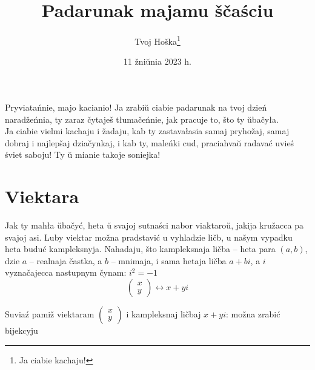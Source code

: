 \documentclass{article}
\title{Padarunak majamu ščaściu}
\author{Tvoj Hoška\thanks{Ja ciabie kachaju!}}
\date{11 žniŭnia 2023 h.}
\newcommand{\rl}{\hspace*{5mm}}
\begin{document}
\maketitle
\begin{center}
    Pryviatańnie, majo kacianio! Ja zrabiŭ ciabie padarunak na tvoj dzień naradžeńnia, ty zaraz čytaješ tłumačeńnie, jak pracuje to, što ty ŭbačyła. \\
    \vspace{3mm}
    Ja ciabie vielmi kachaju i žadaju, kab ty zastavałasia samaj pryhožaj, samaj dobraj i najlepšaj dziačynkaj, i kab ty, maleńki cud, praciahvaŭ radavać uvieś śviet saboju! Ty ŭ mianie takoje soniejka!
\end{center}
\newpage
\section{Viektara}
\rl Jak ty mahła ŭbačyć, heta ŭ svajoj sutnaści nabor viaktaroŭ, jakija kružacca pa svajoj asi.
Luby viektar možna pradstavić u vyhladzie ličb, u našym vypadku heta buduć kampleksnyja.
Nahadaju, što kampleksnaja ličba \--- heta para $(a, b)$, dzie $a$ \--- realnaja častka, a $b$ \--- mnimaja, i sama hetaja ličba $a + bi$,
a $i$ vyznačajecca nastupnym čynam: $i^2 = -1$
\[ \begin{pmatrix} x \\ y \end{pmatrix} \leftrightarrow x + yi \]
\begin{center}
    \scriptsize Suviaź pamiž viektaram $\begin{pmatrix} x \\ y \end{pmatrix}$ i kampleksnaj ličbaj $x + yi$: možna zrabić bijekcyju
\end{center}
\end{document}
